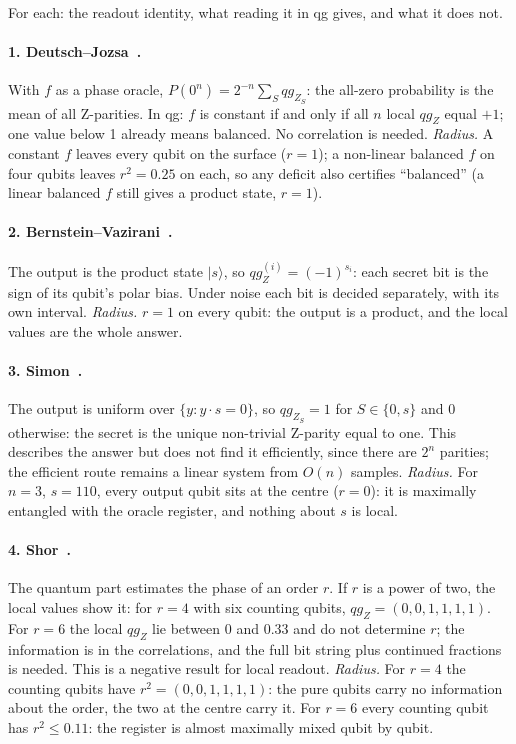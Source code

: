 \documentclass[11pt]{article}
\newcommand{\q}[1]{qg_{#1}}
\newcommand{\qZ}{qg_Z}
\begin{document}
For each: the readout identity, what reading it in qg gives, and what it does not.

\paragraph{1. Deutsch--Jozsa~\cite{deutsch1992}.} With $f$ as a phase oracle, $P(0^n)=2^{-n}\sum_S\q{Z_S}$: the
all-zero probability is the mean of all Z-parities. In qg: $f$ is constant if and only if all $n$ local $\qZ$
equal $+1$; one value below 1 already means balanced. No correlation is needed. \emph{Radius.} A constant $f$ leaves every
qubit on the surface ($r=1$); a non-linear balanced $f$ on four qubits leaves $r^2=0.25$ on each, so any deficit also
certifies ``balanced'' (a linear balanced $f$ still gives a product state, $r=1$).

\paragraph{2. Bernstein--Vazirani~\cite{bernstein1997}.} The output is the product state $|s\rangle$, so
$\qZ^{(i)}=(-1)^{s_i}$: each secret bit is the sign of its qubit's polar bias. Under noise each bit is decided
separately, with its own interval. \emph{Radius.} $r=1$ on every qubit: the output is a product, and
the local values are the whole answer.

\paragraph{3. Simon~\cite{simon1997}.} The output is uniform over $\{y:y\cdot s=0\}$, so $\q{Z_S}=1$ for
$S\in\{0,s\}$ and $0$ otherwise: the secret is the unique non-trivial Z-parity equal to one. This describes the
answer but does not find it efficiently, since there are $2^n$ parities; the efficient route remains a linear
system from $O(n)$ samples. \emph{Radius.} For $n=3$, $s=110$, every output qubit sits at the centre ($r=0$): it is
maximally entangled with the oracle register, and nothing about $s$ is local.

\paragraph{4. Shor~\cite{shor1997}.} The quantum part estimates the phase of an order $r$. If $r$ is a power of
two, the local values show it: for $r=4$ with six counting qubits, $\qZ=(0,0,1,1,1,1)$. For $r=6$ the local $\qZ$
lie between 0 and 0.33 and do not determine $r$; the information is in the correlations, and the full bit string
plus continued fractions is needed. This is a negative result for local readout. \emph{Radius.} For $r=4$ the counting
qubits have $r^2=(0,0,1,1,1,1)$: the pure qubits carry no information about the order, the two at the centre carry
it. For $r=6$ every counting qubit has $r^2\le0.11$: the register is almost maximally mixed qubit by qubit.
\end{document}
